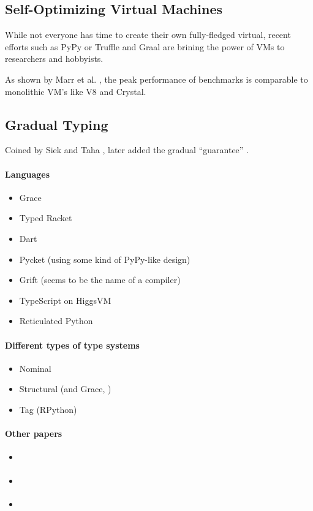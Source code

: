 
\subsection{Self-Optimizing Virtual Machines}

While not everyone has time to create their own fully-fledged virtual, recent efforts such as PyPy  or Truffle and Graal \cite{Wurthinger2013} are brining the power of VMs to researchers and hobbyists.

As shown by Marr et al. \cite{Marr2016}, the peak performance of benchmarks is comparable to monolithic VM's like V8 and Crystal. 

\subsection{Gradual Typing}

Coined by Siek and Taha \cite{Siek2006}, later added the gradual ``guarantee'' \cite{Siek2015}.

\paragraph{Languages}
\begin{itemize}
    \item Grace \cite{Boyland2014}
    \item Typed Racket \cite{Takikawa2016}
    \item Dart \cite{Heinze2016, Mezzetti2016}
    \item Pycket (using some kind of PyPy-like design) \cite{Bauman2017}
    \item Grift (seems to be the name of a compiler) \cite{Kuhlenschmidt2018}
    \item TypeScript on HiggsVM \cite{Richards2017}
    \item Reticulated Python \cite{Vitousek2017, Greenman2017}
\end{itemize}

\paragraph{Different types of type systems}
\begin{itemize}
    \item Nominal \cite{Muehlboeck2017}
    \item Structural \cite{Richards2017} (and Grace, \cite{Boyland2014})
    \item Tag (RPython) \cite{Greenman2017}
\end{itemize}

\paragraph{Other papers}
\begin{itemize}
    \item \cite{Bloom2009}
    \item \cite{Castagna2017}
    \item \cite{Stulova2016}
\end{itemize}
